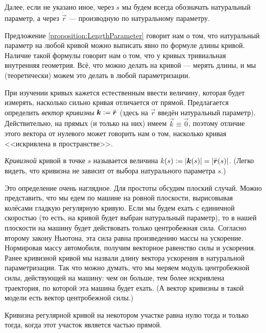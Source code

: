 Далее, если не указано иное, через $s$ мы будем всегда обозначать натуральный параметр, а через $\dot{\vec{r}}$ --- производную по натуральному параметру.

Предложение \ref{proposition:LengthParameter} говорит нам о том, что натуральный параметр на любой кривой можно выписать явно по формуле длины кривой. Наличие такой формулы говорит нам о том, что у кривых тривиальная внутренняя геометрия. Всё, что можно делать на кривой --- мерять длины, и мы (теоретически\footnotemark) можем это делать в любой параметризации.


При изучении кривых кажется естественным ввести величину, которая будет измерять, насколько сильно кривая отличается от прямой. Предлагается определить \textit{вектор кривизны} $\vec{k} \vcentcolon = \ddot{\vec{r}}$ (здесь на $\vec{r}$ введён натуральный параметр). Действительно, на прямых (и только на них) имеем $\vec{k} \equiv \vec{0}$, поэтому отличие этого вектора от нулевого может говорить нам о том, насколько кривая <<искривлена в пространстве>>.

\begin{definition}
	\textit{Кривизной} кривой в точке $s$ называется величина $k(s) \vcentcolon = \abs{\vec{k}(s)} = \abs{\ddot{\vec{r}}(s)}$. (Легко видеть, что кривизна не зависит от выбора натурального параметра $s$.)
\end{definition}

Это определение очень наглядное. Для простоты обсудим плоский случай. Можно представить, что мы едем по машине на ровной плоскости, вырисовывая колёсами гладкую регулярную кривую. Если мы будем ехать с единичной скоростью (то есть, на кривой будет выбран натуральный параметр), то в нашей плоскости на машину будет действовать только центробежная сила. Согласно второму закону Ньютона, эта сила равна произведению массы на ускорение. Нормировав массу автомобиля, получим векторное равенство силы и ускорения. Ранее кривизной кривой мы назвали длину вектора ускорения в натуральной параметризации. Так что можно думать, что мы меряем модуль центробежной силы, действующей на машину: чем он больше, тем более искривлена траектория, по которой эта машина будет ехать. (А вектор кривизны в такой модели есть вектор центробежной силы.)

\begin{proposition}
	Кривизна регулярной кривой на некотором участке равна нулю тогда и только тогда, когда этот участок является частью прямой.
\end{proposition}

